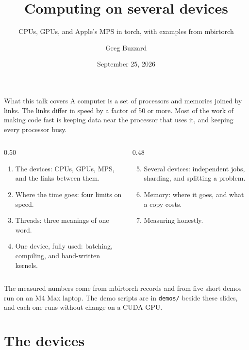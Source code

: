 \documentclass[aspectratio=169,10pt]{beamer}
\title{Computing on several devices}
\subtitle{CPUs, GPUs, and Apple's MPS in torch, with examples from mbirtorch}
\author{Greg Buzzard}
\date{September 25, 2026}
\begin{document}
\maketitle

\begin{frame}{What this talk covers}
  \medskip
  {\large A computer is a set of processors and memories joined by links.
  The links differ in speed by a factor of 50 or more.  Most of the work of
  making code fast is keeping data near the processor that uses it, and
  keeping every processor busy.}\par\vspace{6pt}
  {\small
  \begin{columns}[T]
    \begin{column}{0.50\textwidth}
      \begin{enumerate}
        \item The devices: CPUs, GPUs, MPS, and the links between them.
        \item Where the time goes: four limits on speed.
        \item Threads: three meanings of one word.
        \item One device, fully used: batching, compiling, and hand-written kernels.
      \end{enumerate}
    \end{column}
    \begin{column}{0.48\textwidth}
      \begin{enumerate}\setcounter{enumi}{4}
        \item Several devices: independent jobs, sharding, and splitting a problem.
        \item Memory: where it goes, and what a copy costs.
        \item Measuring honestly.
      \end{enumerate}
    \end{column}
  \end{columns}\vspace{4pt}
  The measured numbers come from mbirtorch records and from five short demos
  run on an M4 Max laptop.  The demo scripts are in \texttt{demos/} beside
  these slides, and each one runs without change on a CUDA GPU.}
\end{frame}

\section{The devices}
\end{document}
